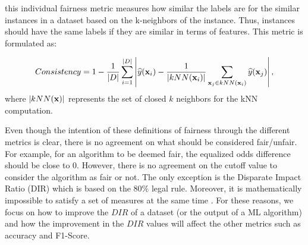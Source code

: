  this individual fairness metric measures how similar the labels are for the similar instances in a dataset based on the k-neighbors of the instance. Thus, instances should have the same labels if they are similar in terms of features. This metric is formulated as:


\[
Consistency = 1 - \frac{1}{|D|}\sum_{i=1}^{|D|} \left| \widehat{y}({\bf x}_i) -
           \frac{1}{\left|kNN({\bf x}_i)\right|} \sum_{{\bf x}_j\in kNN({\bf x}_i)} \widehat{y}({\bf x}_j) \right|,
\]
where $\left|kNN({\bf x})\right|$ represents the set of closed $k$ neighbors for the kNN computation.

Even though the intention of these definitions of fairness through the different metrics is clear, there is no agreement on what should be considered fair/unfair. For example, for an algorithm to be deemed fair, the equalized odds difference should be close to $0$. However, there is no agreement on the cutoff value to consider the algorithm as fair or not. The only exception is the Disparate Impact Ratio (DIR) which is based on the $80\%$ legal rule. Moreover, it is mathematically impossible to satisfy a set of measures at the same time \cite{chouldechova2017fair,kleinberg2017inherent,pleiss2017calibration}. For these reasons, we focus on how to improve the $DIR$ of a dataset (or the output of a ML algorithm) and how the improvement in the $DIR$ values will affect the other metrics such as accuracy and F1-Score. 

